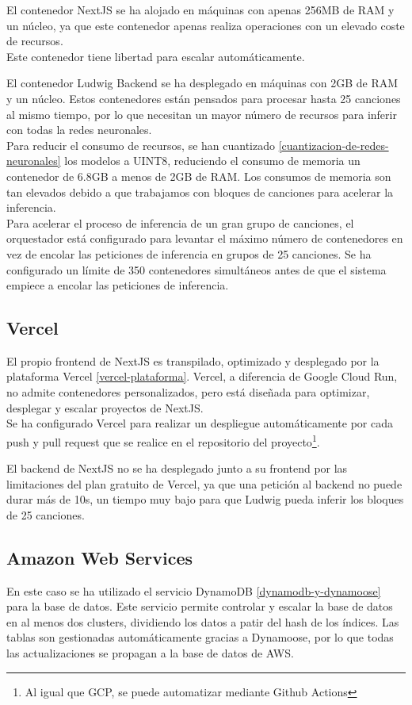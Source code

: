 El contenedor NextJS se ha alojado en máquinas con apenas 256MB de RAM y un núcleo, ya que este contenedor apenas realiza operaciones con un elevado coste de recursos. \\
Este contenedor tiene libertad para escalar automáticamente.

El contenedor Ludwig Backend se ha desplegado en máquinas con 2GB de RAM y un núcleo. Estos contenedores están pensados para procesar hasta 25 canciones al mismo tiempo, por lo que necesitan un mayor número de recursos para inferir con todas la redes neuronales.\\
Para reducir el consumo de recursos, se han cuantizado \ref{cuantizacion-de-redes-neuronales} los modelos a UINT8, reduciendo el consumo de memoria un contenedor de 6.8GB a menos de 2GB de RAM.
Los consumos de memoria son tan elevados debido a que trabajamos con bloques de canciones para acelerar la inferencia.\\ 

Para acelerar el proceso de inferencia de un gran grupo de canciones, el orquestador está configurado para levantar el máximo número de contenedores en vez de encolar las peticiones de inferencia en grupos de 25 canciones. Se ha configurado un límite de 350 contenedores simultáneos antes de que el sistema empiece a encolar las peticiones de inferencia.

\subsection{Vercel}\label{vercel_deployment}
El propio frontend de NextJS es transpilado, optimizado y desplegado por la plataforma Vercel \ref{vercel-plataforma}.
Vercel, a diferencia de Google Cloud Run, no admite contenedores personalizados, pero está diseñada para optimizar, desplegar y escalar proyectos de NextJS.\\
Se ha configurado Vercel para realizar un despliegue automáticamente por cada push y pull request que se realice en el repositorio del proyecto\footnote{Al igual que GCP, se puede automatizar mediante Github Actions}. 

El backend de NextJS no se ha desplegado junto a su frontend por las limitaciones del plan gratuito de Vercel, ya que una petición al backend no puede durar más de 10s, un tiempo muy bajo para que Ludwig pueda inferir los bloques de 25 canciones. 

\subsection{Amazon Web Services}
En este caso se ha utilizado el servicio DynamoDB \ref{dynamodb-y-dynamoose} para la base de datos. Este servicio permite controlar y escalar la base de datos en al menos dos clusters, dividiendo los datos a patir del hash de los índices. 
Las tablas son gestionadas automáticamente gracias a Dynamoose, por lo que todas las actualizaciones se propagan a la base de datos de AWS. 

